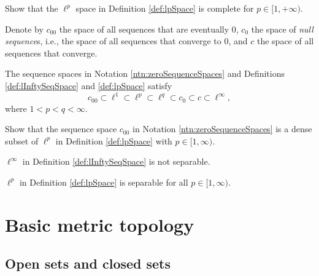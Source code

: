 \begin{exc}
  \label{exc:ellPisComplete}
  Show that the $\ell^p$ space in Definition \ref{def:lpSpace}
  is complete for $p\in [1,+\infty)$.
\end{exc}

\begin{ntn}
  \label{ntn:zeroSequenceSpaces}
  Denote by $c_{00}$ the space of all sequences
  that are eventually 0,
  $c_0$ the space of \emph{null sequence}s,
  i.e., the space of all sequences that converge to 0,
  and $c$ the space of all sequences that converge.
\end{ntn}

\begin{lem}
  \label{lem:filtrationOfSequenceSpaces}
  The sequence spaces in Notation \ref{ntn:zeroSequenceSpaces}
  and Definitions \ref{def:lInftySeqSpace} and \ref{def:lpSpace}
  satisfy
  \begin{equation}
    \label{eq:filtrationOfSequenceSpaces}
    c_{00} \subset \ell^1 \subset \ell^p  \subset \ell^q  
     \subset c_0 \subset c \subset \ell^{\infty},
  \end{equation}
  where $1<p<q<\infty$. 
\end{lem}

\begin{exc}
  \label{exc:c00isDenseInEll2}
  Show that the sequence space $c_{00}$
  in Notation \ref{ntn:zeroSequenceSpaces}
  is a dense subset of $\ell^p$
  in Definition \ref{def:lpSpace} with $p\in[1,\infty)$. 
\end{exc}

\begin{lem}
  \label{lem:ellInftyisNotSeparable}
  $\ell^{\infty}$ in Definition \ref{def:lInftySeqSpace} is not separable.
\end{lem}

\begin{lem}
  \label{lem:ellPisSeparable}
  $\ell^p$ in Definition \ref{def:lpSpace} 
  is separable for all $p\in[1,\infty)$.
\end{lem}

\section{Basic metric topology}
\label{sec:metric-topology}

\subsection{Open sets and closed sets}
\label{sec:open-sets-closed}


